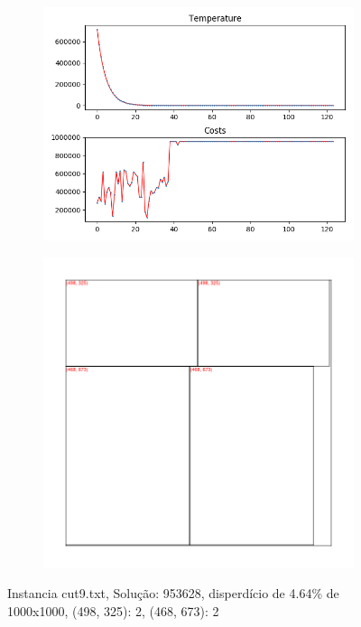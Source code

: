 \begin{figure}
\centering
\begin{subfigure}{.5\textwidth}
  \centering
  \includegraphics[width=1\linewidth]{results/cut9/3/plot}
  \label{fig:sub1}
\end{subfigure}%
\begin{subfigure}{.5\textwidth}
  \centering
  \includegraphics[width=1\linewidth]{results/cut9/3/cut}
  \label{fig:sub2}
\end{subfigure}
\caption{Instancia cut9.txt, Solução: 953628, disperdício de 4.64\% de 1000x1000, {(498, 325): 2, (468, 673): 2}}
\label{fig:test}
\end{figure}



